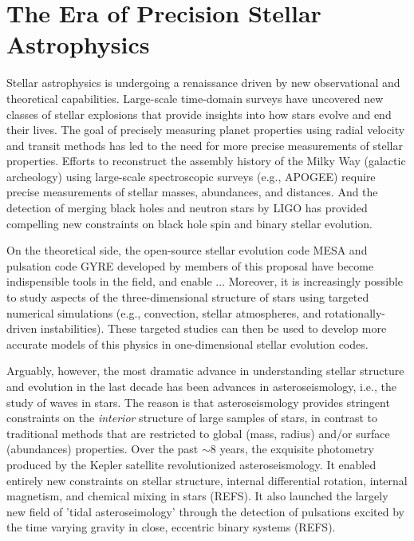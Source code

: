 \section{The Era of Precision Stellar Astrophysics}

Stellar astrophysics is undergoing a renaissance driven by new observational and theoretical capabilities. Large-scale time-domain surveys have uncovered new classes of stellar explosions that provide insights into how stars evolve and end their lives.  The goal of precisely measuring planet properties using radial velocity and transit methods has led to the need for more precise measurements of stellar properties.  Efforts to reconstruct the assembly history of the Milky Way (galactic archeology) using large-scale spectroscopic surveys (e.g., APOGEE) require precise measurements of stellar masses, abundances, and distances.   And the detection of merging black holes and neutron stars by LIGO has provided compelling new constraints on black hole spin and binary stellar evolution.   

On the theoretical side, the open-source stellar evolution code MESA and pulsation code GYRE developed by members of this proposal have become indispensible tools in the field, and enable  ...   Moreover, it is increasingly possible to study aspects of the three-dimensional structure of stars using targeted numerical simulations (e.g., convection, stellar atmospheres, and rotationally-driven instabilities).  These targeted studies can then be used to develop more accurate models of this physics in one-dimensional stellar evolution codes.

Arguably, however, the most dramatic advance in understanding stellar structure and evolution in the last decade has been advances in asteroseismology, i.e., the study of waves in stars.   The reason is that asteroseismology provides stringent constraints on the {\em interior} structure of large samples of stars, in contrast to traditional methods that are restricted to global (mass, radius) and/or surface (abundances) properties.   Over the past $\sim 8$ years, the exquisite photometry produced by the Kepler satellite revolutionized asteroseismology.  It enabled entirely new constraints on stellar structure, internal differential rotation, internal magnetism, and chemical mixing in stars (REFS).  It also launched the largely new field of 'tidal asteroseimology' through the detection of pulsations excited by the time varying gravity in close, eccentric binary systems (REFS). 

